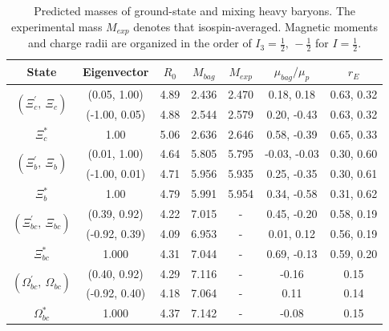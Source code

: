 \documentclass[12pt,onecolumn,floatfix,nofootinbib]{revtex4}
\begin{document}
\renewcommand{\tabcolsep}{0.55cm} \renewcommand{\arraystretch}{1.3}
\begin{table}[!htb]
\caption{Predicted masses of ground-state and mixing heavy baryons. The
experimental mass $M_{exp}$ denotes that isospin-averaged. Magnetic moments 
and charge radii are organized in the order
of $I_{3}=\frac{1}{2},\,-\frac{1}{2}$ for $I=\frac{1}{2}$.}
\label{tab:mixingbaryon}%
\begin{tabular}{ccccccc}
\hline\hline
\textrm{State} & \textrm{Eigenvector} & $R_{0}$ & $M_{bag}$ & $M_{exp}$ & $%
\mu_{bag}/\mu_{p}$ & $r_{E}$ \\ \hline
\multirow{2}{*}{$\left(\Xi_{c}^{\prime},\ \Xi_{c}\right)$} & (0.05, 1.00) &
4.89 & 2.436 & 2.470 & 0.18, 0.18 & 0.63, 0.32 \\
& (-1.00, 0.05) & 4.88 & 2.544 & 2.579 & 0.20, -0.43 & 0.63, 0.32 \\
$\Xi_{c}^{\ast}$ & 1.00 & 5.06 & 2.636 & 2.646 & 0.58, -0.39 & 0.65, 0.33 \\
\multirow{2}{*}{$\left(\Xi_{b}^{\prime},\ \Xi_{b}\right)$} & (0.01, 1.00) &
4.64 & 5.805 & 5.795 & -0.03, -0.03 & 0.30, 0.60 \\
& (-1.00, 0.01) & 4.71 & 5.956 & 5.935 & 0.25, -0.35 & 0.30, 0.61 \\
$\Xi_{b}^{\ast}$ & 1.00 & 4.79 & 5.991 & 5.954 & 0.34, -0.58 & 0.31, 0.62 \\
\multirow{2}{*}{$\left(\Xi_{bc}^{\prime},\ \Xi_{bc}\right)$} & (0.39, 0.92)
& 4.22 & 7.015 & - & 0.45, -0.20 & 0.58, 0.19 \\
& (-0.92, 0.39) & 4.09 & 6.953 & - & 0.01, 0.12 & 0.56, 0.19 \\
$\Xi_{bc}^{\ast}$ & 1.000 & 4.31 & 7.044 & - & 0.69, -0.13 & 0.59, 0.20 \\
\multirow{2}{*}{$\left(\Omega_{bc}^{\prime},\ \Omega_{bc}\right)$} & (0.40,
0.92) & 4.29 & 7.116 & - & -0.16 & 0.15 \\
& (-0.92, 0.40) & 4.18 & 7.064 & - & 0.11 & 0.14 \\
$\Omega_{bc}^{\ast}$ & 1.000 & 4.37 & 7.142 & - & -0.08 & 0.15
\\ \hline\hline
\end{tabular}%
\end{table}
\end{document}
